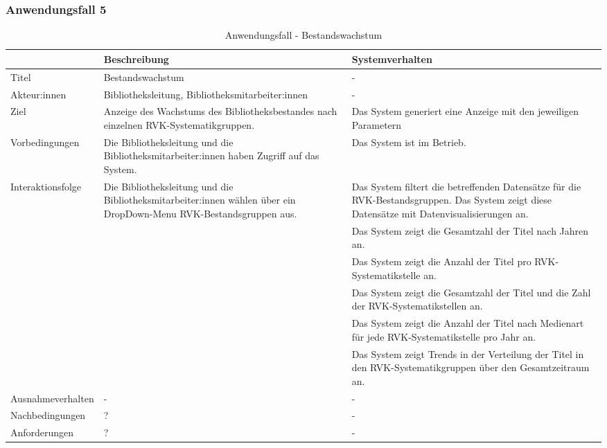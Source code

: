 \subsubsection{Anwendungsfall 5}

\begingroup
\setlength{\tabcolsep}{10pt} %
\renewcommand{\arraystretch}{1.25} 
\begin{table}[H]
    \centering
    \begin{adjustbox}{max width=\textwidth}
    \begin{tabular}{lp{7.0cm}p{7.0cm}}
       \toprule
       \textbf{}          & \textbf{Beschreibung} &\textbf{Systemverhalten}\\
       \midrule
        Titel                            &Bestandswachstum& -\\
        Akteur:innen                     &Bibliotheksleitung, Bibliotheksmitarbeiter:innen& -\\
        Ziel                             &Anzeige des Wachstums des Bibliotheksbestandes nach einzelnen RVK-Systematikgruppen.& Das System generiert eine Anzeige mit den jeweiligen Parametern\\
        Vorbedingungen                   &Die Bibliotheksleitung und die Bibliotheksmitarbeiter:innen haben Zugriff auf das System.& Das System ist im Betrieb.\\
        Interaktionsfolge                &Die Bibliotheksleitung und die Bibliotheksmitarbeiter:innen wählen über ein DropDown-Menu RVK-Bestandsgruppen aus.& Das System filtert die betreffenden Datensätze für die RVK-Bestandsgruppen. Das System zeigt diese Datensätze mit Datenvisualisierungen an.\\
                                         & &Das System zeigt die Gesamtzahl der Titel nach Jahren an.\\
                                         & &Das System zeigt die Anzahl der Titel pro RVK-Systematikstelle an.\\
                                         & &Das System zeigt die Gesamtzahl der Titel und die Zahl der RVK-Systematikstellen an.\\
                                         & &Das System zeigt die Anzahl der Titel nach Medienart für jede RVK-Systematikstelle pro Jahr an.\\
                                         & &Das System zeigt Trends in der Verteilung der Titel in den RVK-Systematikgruppen über den Gesamtzeitraum an.\\
        Ausnahmeverhalten               &- & -\\
        Nachbedingungen                 &?& -\\

        Anforderungen                   &?& -\\
        \bottomrule
    \end{tabular}
    \end{adjustbox}
    \caption{%
    Anwendungsfall - Bestandswachstum   }
    \label{tab:AF_Bestandswachstum}
    \end{table}
\endgroup


